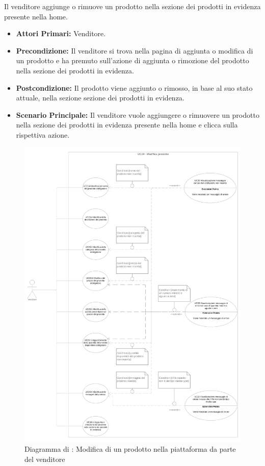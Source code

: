 \resetSubUC

Il venditore aggiunge o rimuove un prodotto nella sezione dei prodotti in evidenza presente nella home.
\begin{itemize}
    \item \textbf{Attori Primari:} Venditore.
    \item \textbf{Precondizione:} Il venditore si trova nella pagina di aggiunta o modifica di un prodotto e ha premuto sull'azione di aggiunta o rimozione del prodotto nella sezione dei prodotti in evidenza.
    \item \textbf{Postcondizione:} Il prodotto viene aggiunto o rimosso, in base al suo stato attuale, nella sezione sezione dei prodotti in evidenza. 
    \item \textbf{Scenario Principale:} Il venditore vuole aggiungere o rimuovere un prodotto nella sezione dei prodotti in evidenza presente nella home e clicca sulla rispettiva azione.
\end{itemize}


\begin{figure}[H]
    \centering
    \includegraphics[scale=0.1]{Immagini/DiagrammiUC/UC19ModificaProdotto.png}
    \caption{Diagramma di \actualUC: Modifica di un prodotto nella piattaforma da parte del venditore}
    \label{fig:ModificaProdotto}
\end{figure}

